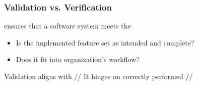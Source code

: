 \subsubsection*{Validation vs. Verification}
\begin{defBox}[title=Validation]
     ensures that a software system meets the 
    \begin{center}
    \end{center}
    \begin{itemize}
        \item Is the implemented feature set as intended and complete?
        \item Does it fit into organization's workflow?
    \end{itemize}
\end{defBox}
\begin{defBox}
    Validation aligns  with //
    It hinges on correctly performed //
\end{defBox}
